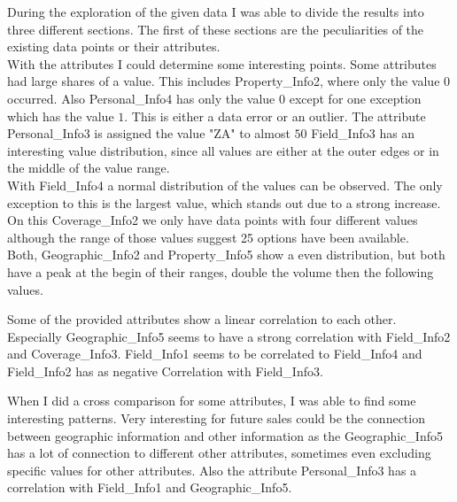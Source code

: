 During the exploration of the given data I was able to divide the results into three different sections.
The first of these sections are the peculiarities of the existing data points or their attributes.\\
With the attributes I could determine some interesting points. Some attributes had large shares of a value. This includes Property\_Info2, where only the value $0$ occurred. Also Personal\_Info4 has only the value $0$ except for one exception which has the value $1$. This is either a data error or an outlier. The attribute Personal\_Info3 is assigned the value "ZA" to almost $50$ %
Field\_Info3 has an interesting value distribution, since all values are either at the outer edges or in the middle of the value range.\\
With Field\_Info4 a normal distribution of the values can be observed. The only exception to this is the largest value, which stands out due to a strong increase.\\
On this Coverage\_Info2 we only have data points with four different values although the range of those values suggest 25 options have been available.\\
Both, Geographic\_Info2 and Property\_Info5 show a even distribution, but both have a peak at the begin of their ranges, double the volume then the following values.

Some of the provided attributes show a linear correlation to each other.\\ Especially Geographic\_Info5 seems to have a strong correlation with Field\_Info2 and Coverage\_Info3. Field\_Info1 seems to be correlated to Field\_Info4 and Field\_Info2 has as negative Correlation with Field\_Info3.

When I did a cross comparison for some attributes, I was able to find some interesting patterns. Very interesting for future sales could be the connection between geographic information and other information as the Geographic\_Info5 has a lot of connection to different other attributes, sometimes even excluding specific values for other attributes. Also the attribute Personal\_Info3 has a correlation with Field\_Info1 and Geographic\_Info5.






